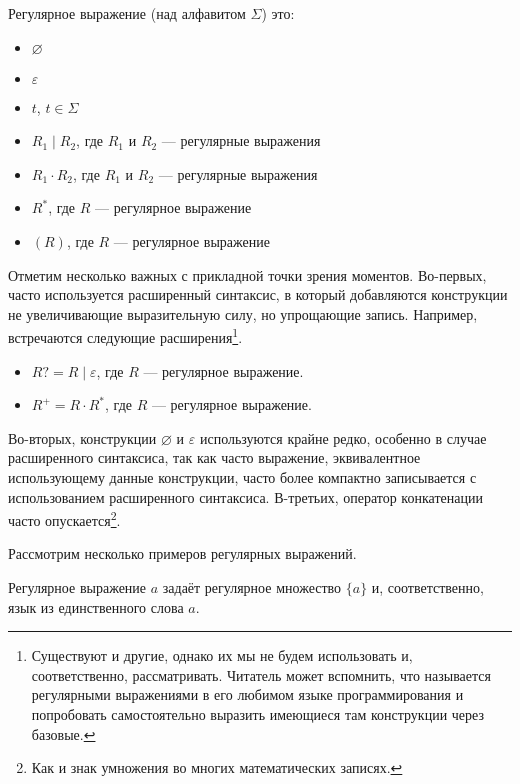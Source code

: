 \begin{definition}
    Регулярное выражение (над алфавитом $\Sigma$) это:
    \begin{itemize}
        \item $\varnothing$
        \item $\varepsilon$
        \item $t$, $t \in \Sigma$
        \item $R_1 \mid R_2$, где $R_1$ и $R_2$ --- регулярные выражения
        \item $R_1 \cdot R_2$, где $R_1$ и $R_2$ --- регулярные выражения
        \item $R^*$, где $R$ --- регулярное выражение
        \item $(R)$, где $R$ --- регулярное выражение
    \end{itemize}
\end{definition}

Отметим несколько важных с прикладной точки зрения моментов.
Во-первых, часто используется расширенный синтаксис, в который добавляются конструкции не увеличивающие выразительную силу, но упрощающие запись.
Например, встречаются следующие расширения\footnote{Существуют и другие, однако их мы не будем использовать и, соответственно, рассматривать. Читатель может вспомнить, что называется регулярными выражениями в его любимом языке программирования и попробовать самостоятельно выразить имеющиеся там конструкции через базовые.}.
\begin{itemize}
    \item $R? = R \mid \varepsilon$, где $R$ --- регулярное выражение.
    \item $R^+ = R \cdot R^*$, где $R$ --- регулярное выражение.
\end{itemize}

Во-вторых, конструкции $\varnothing$ и $\varepsilon$ используются крайне редко, особенно в случае расширенного синтаксиса, так как часто выражение, эквивалентное использующему данные конструкции, часто более компактно записывается с использованием расширенного синтаксиса.
В-третьих, оператор конкатенации часто опускается\footnote{Как и знак умножения во многих математических записях.}.

Рассмотрим несколько примеров регулярных выражений.
\begin{example}
    Регулярное выражение $a$ задаёт регулярное множество $\{a\}$ и, соответственно, язык из единственного слова $a$.
\end{example}

